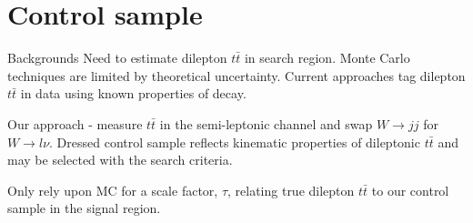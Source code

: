 \documentclass{beamer}
\begin{document}


%
%

\section{Control sample}


\begin{frame}{Backgrounds}
Need to estimate dilepton $t\bar{t}$ in search region. Monte Carlo techniques are limited by theoretical uncertainty. Current approaches tag dilepton $t\bar{t}$ in data using known properties of decay.

Our approach - measure $t\bar{t}$ in the semi-leptonic channel and swap $W\rightarrow jj$ for $W\rightarrow l\nu$. Dressed control sample reflects kinematic properties of dileptonic $t\bar{t}$ and may be selected with the search criteria.

Only rely upon MC for a scale factor, $\tau$, relating true dilepton $t\bar{t}$ to our control sample in the signal region.
\end{frame}
\end{document}
